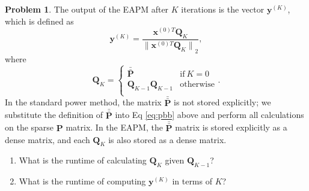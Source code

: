 \documentclass[10pt]{exam}
\theoremstyle{definition}
\newtheorem{problem}{Problem}
\newcommand{\Q}{\mathbf Q}
\newcommand{\p}{\mathbf P}
\newcommand{\pb}{\bar {\p}}
\newcommand{\pbb}{\bar {\pb}}
\newcommand{\x}{\mathbf x}
\newcommand{\y}{\mathbf y}
\newcommand{\ltwo}[1]{{\lVert {#1} \rVert}_2}
\begin{document}
\begin{problem}
    The output of the EAPM after $K$ iterations is the vector $\y^{(K)}$, which is defined as
    \begin{equation}
        \label{eq:exp:y}
        \y^{(K)} = \frac{\x^{(0)T} \Q_K}{\ltwo{\x^{(0)T} \Q_K}}
        ,
    \end{equation}
    where
    \begin{equation}
        \label{eq:Qk}
        \Q_K = 
        \begin{cases}
            \pbb & \text{if}~K=0 \\
            \Q_{K-1} \Q_{K-1} & \text{otherwise} \\
        \end{cases}
        .
    \end{equation}
    In the standard power method, the matrix $\pbb$ is not stored explicitly;
    we substitute the definition of $\pbb$ into Eq \eqref{eq:pbb} above and perform all calculations on the sparse $\p$ matrix.
    In the EAPM, the $\pbb$ matrix is stored explicitly as a dense matrix,
    and each $\Q_K$ is also stored as a dense matrix.

    \begin{enumerate}
%

        \newpage
        \item
            What is the runtime of calculating $\Q_K$ given $\Q_{K-1}$? 
            \vspace{4in}

        \item 
            What is the runtime of computing $\y^{(K)}$ in terms of $K$?
            \vspace{3in}


\end{enumerate}
\end{problem}
\end{document}
